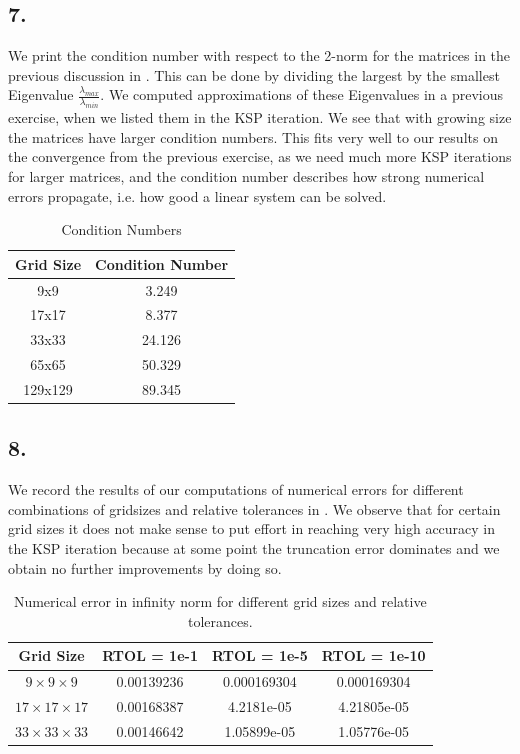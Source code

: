 \subsection*{7.}
\FloatBarrier
We print the condition number with respect to the 2-norm for the matrices in the previous discussion in . This can be done by dividing the largest by the smallest Eigenvalue $\frac{\lambda_{max}}{\lambda_{min}}$. We computed approximations of these Eigenvalues in a previous exercise, when we listed them in the KSP iteration. We see that with growing size the matrices have larger condition numbers. This fits very well to our results on the convergence from the previous exercise, as we need much more KSP iterations for larger matrices, and the condition number describes how strong numerical errors propagate, i.e. how good a linear system can be solved.
\begin{table}[h!]
\centering
\begin{tabular}{|c|c|}
\hline
\textbf{Grid Size} & \textbf{Condition Number} \\ \hline
9x9     & 3.249 \\ \hline
17x17   & 8.377 \\ \hline
33x33   & 24.126 \\ \hline
65x65   & 50.329 \\ \hline
129x129 & 89.345 \\ \hline
\end{tabular}
\caption{Condition Numbers}
\label{condnom}
\end{table}




\FloatBarrier

\subsection*{8.}
\FloatBarrier
We record the results of our computations of numerical errors for different combinations of gridsizes and relative tolerances in . We observe that for certain grid sizes it does not make sense to put effort in reaching very high accuracy in the KSP iteration because at some point the truncation error dominates and we obtain no further improvements by doing so.
\begin{table}[h!]
\centering
\begin{tabular}{|c|c|c|c|}
\hline
\textbf{Grid Size} & \textbf{RTOL = 1e-1} & \textbf{RTOL = 1e-5} & \textbf{RTOL = 1e-10} \\ \hline
$9 \times 9 \times 9$   & 0.00139236  & 0.000169304 & 0.000169304 \\ \hline
$17 \times 17 \times 17$ &0.00168387 & 4.2181e-05 & 4.21805e-05 \\ \hline
$33 \times 33 \times 33$ & 0.00146642 & 1.05899e-05 & 1.05776e-05 \\ \hline
\end{tabular}
\caption{Numerical error in infinity norm for different grid sizes and relative tolerances.}
\label{rtols}
\end{table}

